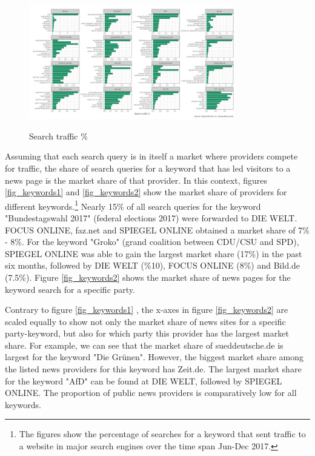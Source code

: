 \documentclass[12pt,a4paper,notitlepage]{article}
\begin{document}
\begin{figure}[H]
	\caption{Search traffic \%}
	\begin{center}
		\includegraphics[width=0.8\textwidth]{../figs/search_traffic.png}
		\label{fig_searchtraffic}
	\end{center}
\end{figure}

Assuming that each search query is in itself a market where providers compete for traffic, the share of search queries for a keyword that has led visitors to a news page is the market share of that provider. In this context, figures \ref{fig_keywords1} and \ref{fig_keywords2} show the market share of providers for different keywords.\footnote{The figures show the percentage of searches for a keyword that sent traffic to a website in major search engines over the time span Jun-Dec 2017.} Nearly 15\% of all search queries for the keyword "Bundestagswahl 2017" (federal elections 2017) were forwarded to DIE WELT. FOCUS ONLINE, faz.net and SPIEGEL ONLINE obtained a market share of 7\% - 8\%. For the keyword "Groko" (grand coalition between CDU/CSU and SPD), SPIEGEL ONLINE was able to gain the largest market share (17\%) in the past six months, followed by DIE WELT (\%10), FOCUS ONLINE (8\%) and Bild.de (7.5\%). Figure \ref{fig_keywords2} shows the market share of news pages for the keyword search for a specific party. 

Contrary to figure \ref{fig_keywords1} , the x-axes in figure \ref{fig_keywords2} are scaled equally to show not only the market share of news sites for a specific party-keyword, but also for which party this provider has the largest market share. For example, we can see that the market share of sueddeutsche.de is largest for the keyword "Die Grünen". However, the biggest market share among the listed news providers for this keyword has Zeit.de. The largest market share for the keyword "AfD" can be found at DIE WELT, followed by SPIEGEL ONLINE. The proportion of public news providers is comparatively low for all keywords. 
\end{document}
